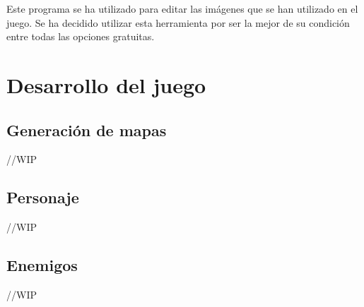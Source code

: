 		Este programa se ha utilizado para editar las imágenes que se han utilizado en el juego. Se ha decidido utilizar esta herramienta por ser la mejor de su condición entre todas las opciones gratuitas.

\section{Desarrollo del juego}

	\subsection{Generación de mapas}

		//WIP

	\subsection{Personaje}

		//WIP

	\subsection{Enemigos}

		//WIP
